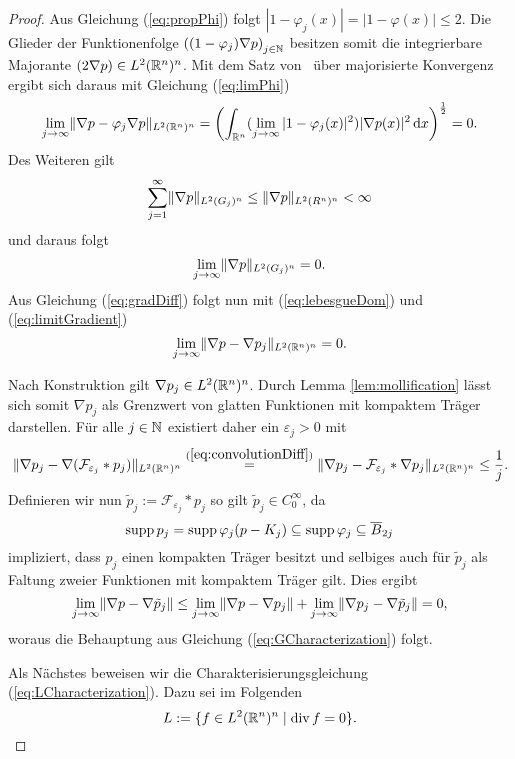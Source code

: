\begin{proof}
  Aus Gleichung (\ref{eq:propPhi}) folgt $|1 - \varphi_j(x)| = |1 - \varphi(x)| \leq 2$. 
  Die Glieder der Funktionenfolge $\left((1 - \varphi_j)\nabla p\right)_{j \in \mathbb{N}}$ besitzen somit die integrierbare Majorante $(2 \nabla p) \in L^2(\mathbb{R}^n)^n$.
  Mit dem Satz von \lebesgue\ über majorisierte Konvergenz ergibt sich daraus mit Gleichung (\ref{eq:limPhi})
  \begin{equation}
    \label{eq:lebesgueDom}
  \lim_{j \to \infty} \lVert \nabla p - \varphi_j \nabla p \rVert_{L^2(\mathbb{R}^n)^n}
  = \left( \int_{\mathbb{R}^n} (\lim_{j \to \infty} |1 - \varphi_j(x)|^2 ) |\nabla p(x)|^2 \, {\operatorname{d}\!{x}} \right)^\frac{1}{2} = 0.
  \end{equation}
  Des Weiteren gilt
  $$
  \sum_{j = 1}^\infty \lVert \nabla p \rVert_{L^2(G_j)^n}
  \leq \lVert \nabla p \rVert_{L^2(R^n)^n}
  < \infty
  $$
  und daraus folgt
  \begin{equation}
    \label{eq:limitGradient}
  \lim_{j \to \infty} \lVert \nabla p \rVert_{L^2(G_j)^n}
  = 0.
  \end{equation}
  Aus Gleichung (\ref{eq:gradDiff}) folgt nun mit (\ref{eq:lebesgueDom}) und (\ref{eq:limitGradient})
  $$
    \lim_{j \to \infty} \lVert \nabla p - \nabla p_j \rVert_{L^2(\mathbb{R}^n)^n} = 0.
  $$

  Nach Konstruktion gilt $\nabla p_j \in L^2(\mathbb{R}^n)^n$.
  Durch Lemma \ref{lem:mollification} lässt sich somit $\nabla p_j$ als Grenzwert von glatten Funktionen mit kompaktem Träger darstellen. Für alle $j \in \mathbb{N}$ existiert daher ein $\varepsilon_j > 0$ mit
  $$
  \lVert \nabla p_j - \nabla (\mathcal{F}_{\varepsilon_j} \ast p_j) \rVert_{L^2(\mathbb{R}^n)^n}
  \overset{(\ref{eq:convolutionDiff})}{=} \lVert \nabla p_j - \mathcal{F}_{\varepsilon_j} \ast \nabla p_j \rVert_{L^2(\mathbb{R}^n)^n}
  \leq \frac{1}{j}.
  $$
  Definieren wir nun $\tilde p_j := \mathcal{F}_{\varepsilon_j} \ast p_j$ so gilt $\tilde p_j \in C_0^\infty$, da 
  $$
  \operatorname{supp} p_j = \operatorname{supp} \varphi_j(p - K_j) 
  \subseteq \operatorname{supp} \varphi_j
  \subseteq \overline B_{2j}
  $$
  impliziert, dass $p_j$ einen kompakten Träger besitzt und selbiges auch für $\tilde p_j$ als Faltung zweier Funktionen mit kompaktem Träger gilt.
  Dies ergibt
  $$
  \lim_{j \to \infty} \lVert \nabla p - \nabla \tilde p_j \rVert
  \leq 
  \lim_{j \to \infty} \lVert \nabla p - \nabla p_j \rVert + \lim_{j \to \infty} \lVert \nabla p_j - \nabla \tilde p_j \rVert
  = 0,
  $$
  woraus die Behauptung aus Gleichung (\ref{eq:GCharacterization}) folgt.

  Als Nächstes beweisen wir die Charakterisierungsgleichung (\ref{eq:LCharacterization}).
  Dazu sei im Folgenden
  $$
  L := \{ f \in L^2(\mathbb{R}^n)^n \mid \mathrm{div\,} f = 0 \}.
  $$


\end{proof}
